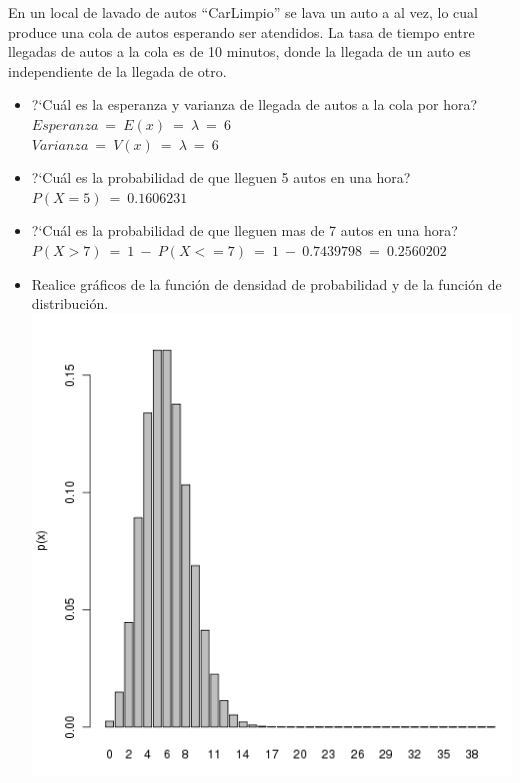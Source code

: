 En un local de lavado de autos ``CarLimpio'' se lava un auto a al vez, lo cual produce una cola de autos esperando ser atendidos.
La tasa de tiempo entre llegadas de autos a la cola es de 10 minutos, donde la llegada de un auto es independiente de la llegada de otro.
\begin{itemize}
	\item ?`Cu\'al es la esperanza y varianza de llegada de autos a la cola por hora?\\
		$Esperanza\ =\ E(x)\ =\ \lambda\ =\ 6$\\
		$Varianza\ =\ V(x)\ =\ \lambda\ =\ 6$\\
	\item ?`Cu\'al es la probabilidad de que lleguen 5 autos en una hora?\\
		$P(X=5)\ =\ 0.1606231\ $\\ %
	\item ?`Cu\'al es la probabilidad de que lleguen mas de 7 autos en una hora?\\
		$P(X>7)\ =\ 1\ -\ P(X<=7)\ =\ 1\ -\ 0.7439798\ =\ 0.2560202\ $\\ %
	\item Realice gr\'aficos de la funci\'on de densidad de probabilidad y de la funci\'on de distribuci\'on.\\
		\includegraphics[scale=0.5]{images/1_4-dpois} \\%

\end{itemize}
